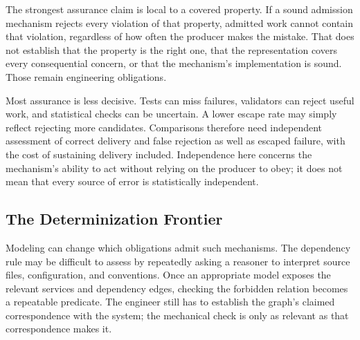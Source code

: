 
The strongest assurance claim is local to a covered property. If a sound admission mechanism rejects every violation of that property, admitted work cannot contain that violation, regardless of how often the producer makes the mistake. That does not establish that the property is the right one, that the representation covers every consequential concern, or that the mechanism's implementation is sound. Those remain engineering obligations.

Most assurance is less decisive. Tests can miss failures, validators can reject useful work, and statistical checks can be uncertain. A lower escape rate may simply reflect rejecting more candidates. Comparisons therefore need independent assessment of correct delivery and false rejection as well as escaped failure, with the cost of sustaining delivery included. Independence here concerns the mechanism's ability to act without relying on the producer to obey; it does not mean that every source of error is statistically independent.

\subsection{The Determinization Frontier}\label{heading:the-determinization-frontier}


Modeling can change which obligations admit such mechanisms. The dependency rule may be difficult to assess by repeatedly asking a reasoner to interpret source files, configuration, and conventions. Once an appropriate model exposes the relevant services and dependency edges, checking the forbidden relation becomes a repeatable predicate. The engineer still has to establish the graph's claimed correspondence with the system; the mechanical check is only as relevant as that correspondence makes it.


